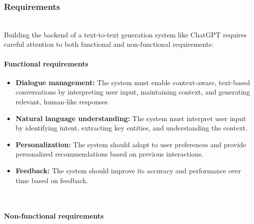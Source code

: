 \subsubsection{Requirements}\label{FZMkX0TR-QmIkF-MWdBVA}
\\
Building the backend of a text-to-text generation system like ChatGPT requires careful attention to both functional and non-functional requirements:
\\
\paragraph{Functional requirements}\label{DFCd17zFOBGViuQafshyy}

\begin{itemize}
\item
\protect{}\label{L_GI5RoZiXDJuK4sY-lai}
\textbf{Dialogue management:} The system must enable context-aware, text-based conversations by interpreting user input, maintaining context, and generating relevant, human-like responses.
\item
\protect{}\label{QJCXpLUt_YRh8raDTPcpm}
\textbf{Natural language understanding:} The system must interpret user input by identifying intent, extracting key entities, and understanding the context.
\item
\protect{}\label{6BTHpAwAm0H9KvTO2HpQl}
\textbf{Personalization:} The system should adapt to user preferences and provide personalized recommendations based on previous interactions.~~
\item
\protect{}\label{_ZInHTh2JB7cYNb0blEUs}
\textbf{Feedback:} The system should improve its accuracy and performance over time based on feedback.
\end{itemize}
\\
\paragraph{Non-functional requirements}\label{3NchEvyQ48jUNx040Rnc9}

